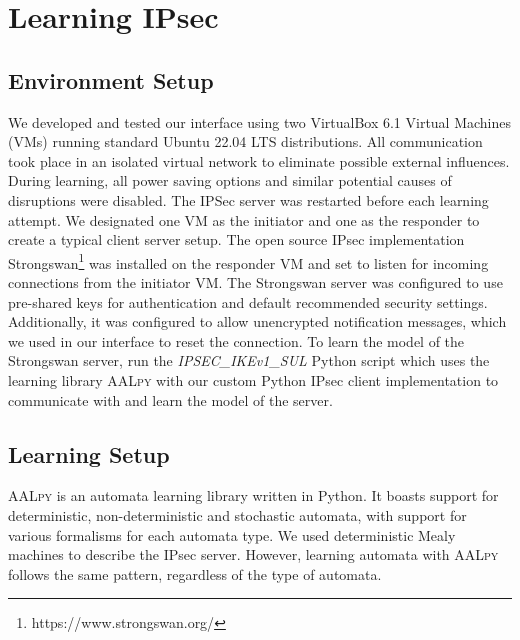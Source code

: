 \documentclass[runningheads]{llncs}
\begin{document}
\section{Learning IPsec} \label{chap:4} %
\subsection{Environment Setup} %
We developed and tested our interface using two VirtualBox 6.1 Virtual Machines (VMs) running standard Ubuntu 22.04 LTS distributions. All communication took place in an isolated virtual network to eliminate possible external influences. During learning, all power saving options and similar potential causes of disruptions were disabled. The IPSec server was restarted before each learning attempt. We designated one VM as the initiator and one as the responder to create a typical client server setup. The open source IPsec implementation Strongswan\footnote{https://www.strongswan.org/} was installed on the responder VM and set to listen for incoming connections from the initiator VM. The Strongswan server was configured to use pre-shared keys for authentication and default recommended security settings. Additionally, it was configured to allow unencrypted notification messages, which we used in our interface to reset the connection. To learn the model of the Strongswan server, run the \emph{IPSEC\_IKEv1\_SUL} Python script which uses the learning library \textsc{AALpy} with our custom Python IPsec client implementation to communicate with and learn the model of the server. %

\subsection{Learning Setup} %
\textsc{AALpy} is an automata learning library written in Python. It boasts support for deterministic, non-deterministic and stochastic automata, with support for various formalisms for each automata type. We used deterministic Mealy machines to describe the IPsec server. However, learning automata with \textsc{AALpy} follows the same pattern, regardless of the type of automata.
\end{document}
